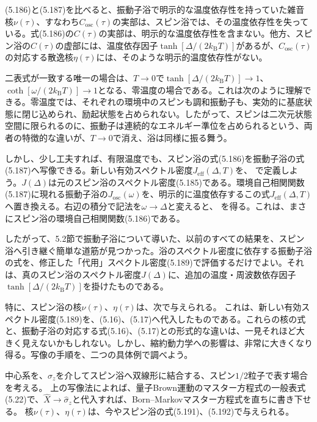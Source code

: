 (5.186)と(5.187)を比べると、振動子浴で明示的な温度依存性を持っていた雑音核$\nu(\tau)$、すなわち$C_{\mathrm{osc}}(\tau)$の実部は、スピン浴では、その温度依存性を失っている。式(5.186)の$C(\tau)$の実部は、明示的な温度依存性を含まない。他方、スピン浴の$C(\tau)$の虚部には、温度依存因子$\tanh[\Delta/(2k_{\mathrm B}T)]$があるが、$C_{\mathrm{osc}}(\tau)$の対応する散逸核$\eta(\tau)$には、そのような明示的温度依存性がない。

二表式が一致する唯一の場合は、$T\to0$で$\tanh[\Delta/(2k_{\mathrm B}T)]\to1$、$\coth[\omega/(2k_{\mathrm B}T)]\to1$となる、零温度の場合である。これは次のように理解できる。零温度では、それぞれの環境中のスピンも調和振動子も、実効的に基底状態に閉じ込められ、励起状態を占められない。したがって、スピンは二次元状態空間に限られるのに、振動子は連続的なエネルギー準位を占められるという、両者の特徴的な違いが、$T\to0$で消え、浴は同様に振る舞う。

\hypertarget{srcpage:233}{}\label{srcpage:233}
しかし、少し工夫すれば、有限温度でも、スピン浴の式(5.186)を振動子浴の式(5.187)へ写像できる。新しい有効スペクトル密度$J_{\mathrm{eff}}(\Delta,T)$を、
で定義しよう。$J(\Delta)$は元のスピン浴のスペクトル密度(5.185)である。環境自己相関関数(5.187)に現れる振動子浴の$J_{\mathrm{osc}}(\omega)$を、明示的に温度依存するこの式$J_{\mathrm{eff}}(\Delta,T)$へ置き換える。右辺の積分で記法を$\omega\to\Delta$と変えると、
を得る。これは、まさにスピン浴の環境自己相関関数(5.186)である。

したがって、5.2節で振動子浴について導いた、以前のすべての結果を、スピン浴へ引き継ぐ簡単な道筋が見つかった。浴のスペクトル密度に依存する振動子浴の式を、修正した「代用」スペクトル密度(5.189)で評価するだけでよい。それは、真のスピン浴のスペクトル密度$J(\Delta)$に、追加の温度・周波数依存因子$\tanh[\Delta/(2k_{\mathrm B}T)]$を掛けたものである。

特に、スピン浴の核$\nu(\tau)$、$\eta(\tau)$は、次で与えられる。
これは、新しい有効スペクトル密度(5.189)を、(5.16)、(5.17)へ代入したものである。これらの核の式と、振動子浴の対応する式(5.16)、(5.17)との形式的な違いは、一見それほど大きく見えないかもしれない。しかし、縮約動力学への影響は、非常に大きくなり得る。写像の手順を、二つの具体例で調べよう。

中心系を、$\hat\sigma_z$を介してスピン浴へ双線形に結合する、スピン$1/2$粒子で表す場合を考える。
\hypertarget{srcpage:234}{}\label{srcpage:234}
上の写像法によれば、量子Brown運動のマスター方程式の一般表式(5.22)で、$\hat X\to\hat\sigma_z$と代入すれば、Born--Markovマスター方程式を直ちに書き下せる。
核$\nu(\tau)$、$\eta(\tau)$は、今やスピン浴の式(5.191)、(5.192)で与えられる。

